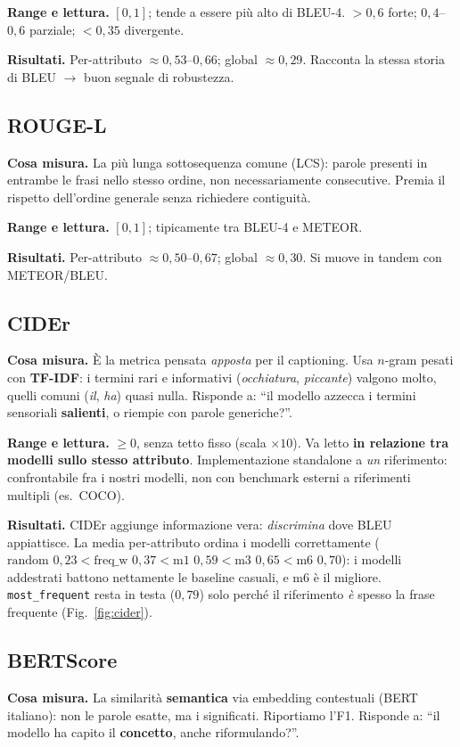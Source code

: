 \documentclass[11pt,a4paper]{article}
\begin{document}
\textbf{Range e lettura.} $[0,1]$; tende a essere più alto di BLEU-4.
$>0{,}6$ forte; $0{,}4$--$0{,}6$ parziale; $<0{,}35$ divergente.

\textbf{Risultati.} Per-attributo $\approx 0{,}53$--$0{,}66$; global $\approx
0{,}29$. Racconta la stessa storia di BLEU $\to$ buon segnale di robustezza.

\subsection{ROUGE-L}
\textbf{Cosa misura.} La più lunga sottosequenza comune (LCS): parole presenti in
entrambe le frasi nello stesso ordine, non necessariamente consecutive. Premia il
rispetto dell'ordine generale senza richiedere contiguità.

\textbf{Range e lettura.} $[0,1]$; tipicamente tra BLEU-4 e METEOR.

\textbf{Risultati.} Per-attributo $\approx 0{,}50$--$0{,}67$; global $\approx
0{,}30$. Si muove in tandem con METEOR/BLEU.

\subsection{CIDEr}
\textbf{Cosa misura.} È la metrica pensata \emph{apposta} per il captioning. Usa
$n$-gram pesati con \textbf{TF-IDF}: i termini rari e informativi
(\textit{occhiatura}, \textit{piccante}) valgono molto, quelli comuni
(\textit{il}, \textit{ha}) quasi nulla. Risponde a: ``il modello azzecca i
termini sensoriali \textbf{salienti}, o riempie con parole generiche?''.

\textbf{Range e lettura.} $\ge 0$, senza tetto fisso (scala $\times 10$). Va letto
\textbf{in relazione tra modelli sullo stesso attributo}. Implementazione
standalone a \emph{un} riferimento: confrontabile fra i nostri modelli, non con
benchmark esterni a riferimenti multipli (es.\ COCO).

\textbf{Risultati.} CIDEr aggiunge informazione vera: \emph{discrimina} dove BLEU
appiattisce. La media per-attributo ordina i modelli correttamente
($\text{random } 0{,}23 < \text{freq\_w } 0{,}37 < \text{m1 } 0{,}59 <
\text{m3 } 0{,}65 < \text{m6 } 0{,}70$): i modelli addestrati battono nettamente
le baseline casuali, e \mbox{m6} è il migliore. \texttt{most\_frequent} resta in
testa ($0{,}79$) solo perché il riferimento \emph{è} spesso la frase frequente
(Fig.~\ref{fig:cider}).

\subsection{BERTScore}
\textbf{Cosa misura.} La similarità \textbf{semantica} via embedding contestuali
(BERT italiano): non le parole esatte, ma i significati. Riportiamo l'F1.
Risponde a: ``il modello ha capito il \textbf{concetto}, anche riformulando?''.
\end{document}
